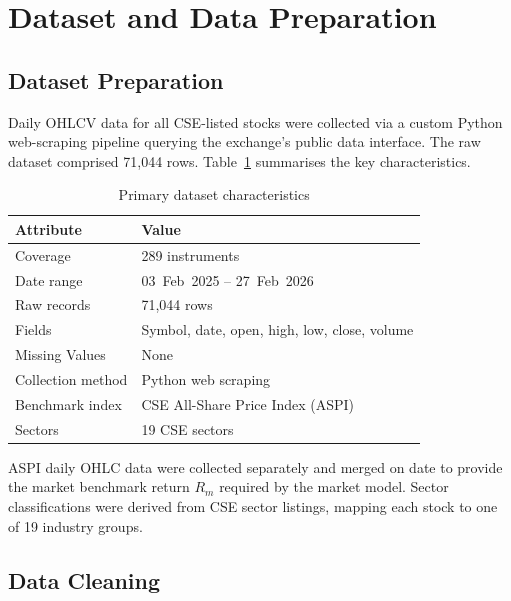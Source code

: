 \documentclass[sigconf, nonacm]{acmart}
\begin{document}
\section{Dataset and Data Preparation}

\subsection{Dataset Preparation}

Daily OHLCV data for all CSE-listed stocks were collected via a custom
Python web-scraping pipeline querying the exchange's public data interface.
The raw dataset comprised 71,044 rows. Table~\ref{tab:dataset} summarises the key characteristics.

\begin{table}[h]
  \centering
  \caption{Primary dataset characteristics}
  \label{tab:dataset}
  \small
  \begin{tabular}{@{}ll@{}}
    \toprule
    \textbf{Attribute} & \textbf{Value} \\
    \midrule
    Coverage          & 289 instruments \\
    Date range        & 03~Feb~2025 -- 27~Feb~2026 \\
    Raw records       & 71,044 rows \\
    Fields            & Symbol, date, open, high, low, close, volume \\
    Missing Values            & None \\
    Collection method & Python web scraping \\
    Benchmark index   & CSE All-Share Price Index (ASPI) \\
    Sectors           & 19 CSE sectors \\
    \bottomrule
  \end{tabular}
\end{table}

ASPI daily OHLC data were collected separately and merged on date to
provide the market benchmark return $R_{m}$ required by the market model.
Sector classifications were derived from CSE sector listings, mapping each
stock to one of 19 industry groups.

\subsection{Data Cleaning}
\end{document}
